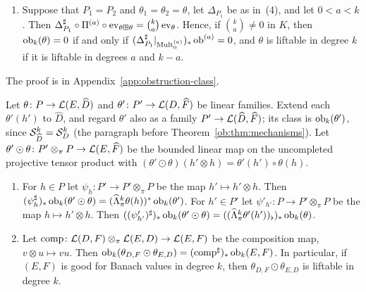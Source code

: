 \begin{theorem}
\begin{enumerate}
$a$, then $\theta_1+\theta_2=(\theta_1\boxplus\theta_2)\circ\Delta_{P_1}$ is liftable in degree $k$. In particular,
$\theta_1+\theta_2$ is liftable in degree $k$ if $\theta_1$ and $\theta_2$ are liftable in every degree at most $k$.
\item Suppose that $P_1=P_2$ and $\theta_1=\theta_2=\theta$, let $\Delta_{P_1}$ be as in~(4), and let $0<a<k$. Then
$\Delta_{P_1}^\sharp\circ\Pi^{(a)}\circ\operatorname{ev}_{\theta\boxplus\theta}=\binom ka\operatorname{ev}_\theta$. Hence, if $\binom ka\ne0$ in $K$, then
$\operatorname{ob}_k(\theta)=0$ if and only if $(\Delta_{P_1}^\sharp|_{\operatorname{Mult}^{(a)}_0})_*\operatorname{ob}^{(a)}=0$, and $\theta$ is liftable in degree $k$
if it is liftable in degrees $a$ and $k-a$.
\end{enumerate}
\end{theorem}

The proof is in Appendix~\ref{app:obstruction-class}.

\begin{proposition}\label{cmb:prop:composition}
Let $\theta\colon P\to\mathcal L(E,\widehat D)$ and $\theta'\colon P'\to\mathcal L(D,\widehat F)$ be linear families. Extend each $\theta'(h')$ to
$\widehat D$, and regard $\theta'$ also as a family $P'\to\mathcal L(\widehat D,\widehat F)$; its class is $\operatorname{ob}_k(\theta')$, since
$\mathcal S^k_{\widehat D}=\mathcal S^k_D$ (the paragraph before Theorem~\ref{ob:thm:mechanisms}). Let
$\theta'\odot\theta\colon P'\otimes_\pi P\to\mathcal L(E,\widehat F)$ be the bounded linear map on the uncompleted projective tensor
product with $(\theta'\odot\theta)(h'\otimes h)=\theta'(h')\circ\theta(h)$.
\begin{enumerate}
\item For $h\in P$ let $\psi_h\colon P'\to P'\otimes_\pi P$ be the map $h'\mapsto h'\otimes h$. Then
$(\psi_h^\sharp)_*\operatorname{ob}_k(\theta'\odot\theta)=(\widehat\Lambda^k_\pi\theta(h))^*\operatorname{ob}_k(\theta')$. For $h'\in P'$ let
$\psi'_{h'}\colon P\to P'\otimes_\pi P$ be the map $h\mapsto h'\otimes h$. Then
$((\psi'_{h'})^\sharp)_*\operatorname{ob}_k(\theta'\odot\theta)=((\widehat\Lambda^k_\pi\theta'(h'))_\flat)_*\operatorname{ob}_k(\theta)$.
\item Let $\operatorname{comp}\colon\mathcal L(D,F)\otimes_\pi\mathcal L(E,D)\to\mathcal L(E,F)$ be the composition map, $v\otimes u\mapsto vu$.
Then $\operatorname{ob}_k(\theta_{D,F}\odot\theta_{E,D})=(\operatorname{comp}^\sharp)_*\operatorname{ob}_k(E,F)$. In particular, if $(E,F)$ is good for
Banach values in degree $k$, then $\theta_{D,F}\odot\theta_{E,D}$ is liftable in degree $k$.
\end{enumerate}
\end{proposition}

